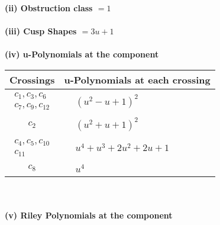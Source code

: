 \documentclass[1p]{elsarticle_modified}
\theoremstyle{definition}
\begin{document}
\flushleft \textbf{(ii) Obstruction class $= 1$}\\~\\
\flushleft \textbf{(iii) Cusp Shapes $= 3 u+1$}\\~\\
\newpage\renewcommand{\arraystretch}{1}
\flushleft \textbf{(iv) u-Polynomials at the component}\newline \\
\begin{tabular}{m{50pt}|m{274pt}}
Crossings & \hspace{64pt}u-Polynomials at each crossing \\
\hline $$\begin{aligned}c_{1},c_{3},c_{6}\\c_{7},c_{9},c_{12}\end{aligned}$$&$\begin{aligned}
&(u^2- u+1)^2
\end{aligned}$\\
\hline $$\begin{aligned}c_{2}\end{aligned}$$&$\begin{aligned}
&(u^2+u+1)^2
\end{aligned}$\\
\hline $$\begin{aligned}c_{4},c_{5},c_{10}\\c_{11}\end{aligned}$$&$\begin{aligned}
&u^4+u^3+2 u^2+2 u+1
\end{aligned}$\\
\hline $$\begin{aligned}c_{8}\end{aligned}$$&$\begin{aligned}
&u^4
\end{aligned}$\\
\hline
\end{tabular}\\~\\
\newpage\renewcommand{\arraystretch}{1}
\flushleft \textbf{(v) Riley Polynomials at the component}\newline \\
\end{document}
